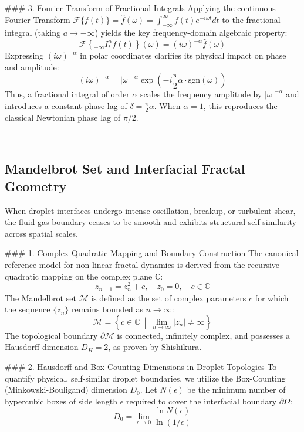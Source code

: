 \documentclass[11pt,a4paper]{article}
\begin{document}
### 3. Fourier Transform of Fractional Integrals
Applying the continuous Fourier Transform $\mathcal{F}\{f(t)\} = \hat{f}(\omega) = \int_{-\infty}^{\infty} f(t) e^{-i\omega t} dt$ to the fractional integral (taking $a \to -\infty$) yields the key frequency-domain algebraic property:
\begin{equation}
\mathcal{F} \left\{ {}_{-\infty}I_{t}^{\alpha} f(t) \right\}(\omega) = (i\omega)^{-\alpha} \hat{f}(\omega)
\end{equation}
Expressing $(i\omega)^{-\alpha}$ in polar coordinates clarifies its physical impact on phase and amplitude:
\begin{equation}
(i\omega)^{-\alpha} = |\omega|^{-\alpha} \exp \left( -i \frac{\pi}{2} \alpha \cdot \text{sgn}(\omega) \right)
\end{equation}
Thus, a fractional integral of order $\alpha$ scales the frequency amplitude by $|\omega|^{-\alpha}$ and introduces a constant phase lag of $\delta = \frac{\pi}{2}\alpha$. When $\alpha = 1$, this reproduces the classical Newtonian phase lag of $\pi/2$.

---

\subsection{Mandelbrot Set and Interfacial Fractal Geometry}

When droplet interfaces undergo intense oscillation, breakup, or turbulent shear, the fluid-gas boundary ceases to be smooth and exhibits structural self-similarity across spatial scales.

### 1. Complex Quadratic Mapping and Boundary Construction
The canonical reference model for non-linear fractal dynamics is derived from the recursive quadratic mapping on the complex plane $\mathbb{C}$:
\begin{equation}
z_{n+1} = z_n^2 + c, \quad z_0 = 0, \quad c \in \mathbb{C}
\end{equation}
The Mandelbrot set $\mathcal{M}$ is defined as the set of complex parameters $c$ for which the sequence $\{z_n\}$ remains bounded as $n \to \infty$:
\begin{equation}
\mathcal{M} = \left\{ c \in \mathbb{C} \ \middle|\ \lim_{n \to \infty} |z_n| \neq \infty \right\}
\end{equation}
The topological boundary $\partial \mathcal{M}$ is connected, infinitely complex, and possesses a Hausdorff dimension $D_H = 2$, as proven by Shishikura.

### 2. Hausdorff and Box-Counting Dimensions in Droplet Topologies
To quantify physical, self-similar droplet boundaries, we utilize the Box-Counting (Minkowski-Bouligand) dimension $D_0$. Let $N(\epsilon)$ be the minimum number of hypercubic boxes of side length $\epsilon$ required to cover the interfacial boundary $\partial \Omega$:
\begin{equation}
D_0 = \lim_{\epsilon \to 0} \frac{\ln N(\epsilon)}{\ln(1/\epsilon)}
\end{equation}
\end{document}
